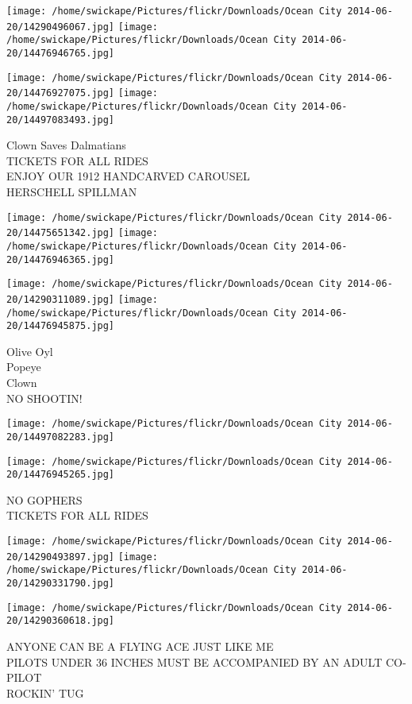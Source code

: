 \documentclass[10pt,letterpaper]{article}
\begin{document}
\texttt{[image: /home/swickape/Pictures/flickr/Downloads/Ocean City 2014-06-20/14290496067.jpg]}
\texttt{[image: /home/swickape/Pictures/flickr/Downloads/Ocean City 2014-06-20/14476946765.jpg]}

\texttt{[image: /home/swickape/Pictures/flickr/Downloads/Ocean City 2014-06-20/14476927075.jpg]}
\texttt{[image: /home/swickape/Pictures/flickr/Downloads/Ocean City 2014-06-20/14497083493.jpg]}

Clown Saves Dalmatians\\
TICKETS FOR ALL RIDES\\
ENJOY OUR 1912 HANDCARVED CAROUSEL\\
HERSCHELL SPILLMAN
\pagebreak

\texttt{[image: /home/swickape/Pictures/flickr/Downloads/Ocean City 2014-06-20/14475651342.jpg]}
\texttt{[image: /home/swickape/Pictures/flickr/Downloads/Ocean City 2014-06-20/14476946365.jpg]}

\texttt{[image: /home/swickape/Pictures/flickr/Downloads/Ocean City 2014-06-20/14290311089.jpg]}
\texttt{[image: /home/swickape/Pictures/flickr/Downloads/Ocean City 2014-06-20/14476945875.jpg]}

Olive Oyl\\
Popeye\\
Clown\\
NO SHOOTIN!
\pagebreak

\texttt{[image: /home/swickape/Pictures/flickr/Downloads/Ocean City 2014-06-20/14497082283.jpg]}

\vspace{0.25in}
\texttt{[image: /home/swickape/Pictures/flickr/Downloads/Ocean City 2014-06-20/14476945265.jpg]}

NO GOPHERS\\
TICKETS FOR ALL RIDES
\pagebreak

\texttt{[image: /home/swickape/Pictures/flickr/Downloads/Ocean City 2014-06-20/14290493897.jpg]}
\texttt{[image: /home/swickape/Pictures/flickr/Downloads/Ocean City 2014-06-20/14290331790.jpg]}

\texttt{[image: /home/swickape/Pictures/flickr/Downloads/Ocean City 2014-06-20/14290360618.jpg]}

ANYONE CAN BE A FLYING ACE JUST LIKE ME\\
PILOTS UNDER 36 INCHES MUST BE ACCOMPANIED BY AN ADULT CO{-}PILOT\\
ROCKIN' TUG
\pagebreak
\end{document}
